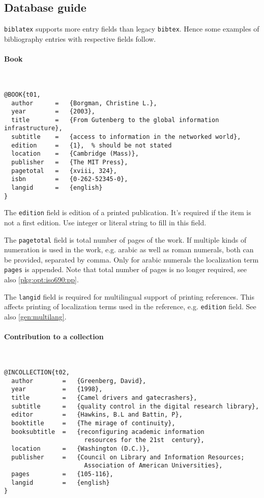 \documentclass[a4paper,10pt]{ltxdockit}
\def\t|#1|{\texttt{#1}}
\def\c#1{%
\hangpara{3em}{1}%
\fullcite{#1}}
\begin{document}
\subsection{Database guide}

\t|biblatex| supports more entry fields than legacy \t|bibtex|. Hence
some examples of bibliography entries with respective fields follow.


\paragraph{Book} \hfill\\

\c{t01}
\begin{verbatim}
@BOOK{t01,
  author      =   {Borgman, Christine L.}, 
  year        =   {2003},
  title       =   {From Gutenberg to the global information infrastructure}, 
  subtitle    =   {access to information in the networked world},
  edition     =   {1},  % should be not stated
  location    =   {Cambridge (Mass)}, 
  publisher   =   {The MIT Press},
  pagetotal   =   {xviii, 324},
  isbn        =   {0-262-52345-0},
  langid      =   {english}
}
\end{verbatim} 

The \t|edition| field is edition of a printed publication. It's required
if the item is not a first edition. Use integer or literal string to fill in
this field.

The \t|pagetotal| field is total number of pages of the work. If multiple
kinds of numeration is used in the work, e.g. arabic as well as roman numerals,
both can be provided, separated by comma. Only for arabic numerals
the localization term \t|pages| is appended. Note that total number of pages
is no longer required, see also \ref{pkg:opt:iso690:pp}.

The \t|langid| field is required for multilingual support of printing
references. This affects printing of localization terms used in the reference,
e.g. \t|edition| field. See also \ref{gen:multilang}.

\paragraph{Contribution to a collection} \hfill\\

\c{t02}
\begin{verbatim}
@INCOLLECTION{t02,
  author        =   {Greenberg, David}, 
  year          =   {1998},
  title         =   {Camel drivers and gatecrashers},
  subtitle      =   {quality control in the digital research library},
  editor        =   {Hawkins, B.L and Battin, P},
  booktitle     =   {The mirage of continuity},
  booksubtitle  =   {reconfiguring academic information 
                      resources for the 21st  century}, 
  location      =   {Washington (D.C.)}, 
  publisher     =   {Council on Library and Information Resources; 
                      Association of American Universities}, 
  pages         =   {105-116},
  langid        =   {english}
}
\end{verbatim} 
\end{document}
